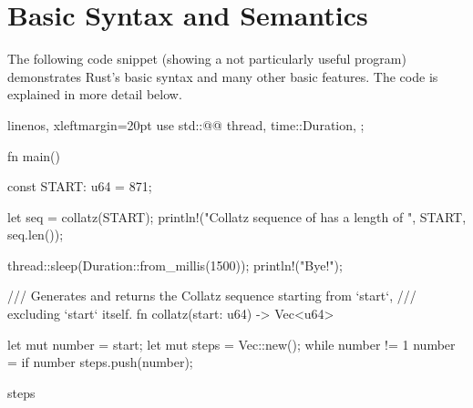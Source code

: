 \section{Basic Syntax and Semantics}

The following code snippet (showing a not particularly useful program) demonstrates Rust's basic syntax and many other basic features.
The code is explained in more detail below.

\begin{rustcode*}{linenos, xleftmargin=20pt}
use std::{@@
    thread,
    time::Duration,
};

fn main() {
    const START: u64 = 871;

    let seq = collatz(START);
    println!("Collatz sequence of {} has a length of {}", START, seq.len());

    thread::sleep(Duration::from_millis(1500));
    println!("Bye!");
}

/// Generates and returns the Collatz sequence starting from `start`,
/// excluding `start` itself.
fn collatz(start: u64) -> Vec<u64> {
    let mut number = start;
    let mut steps = Vec::new();
    while number != 1 {
        number = if number %
        steps.push(number);
    }

    steps
}
\end{rustcode*}

